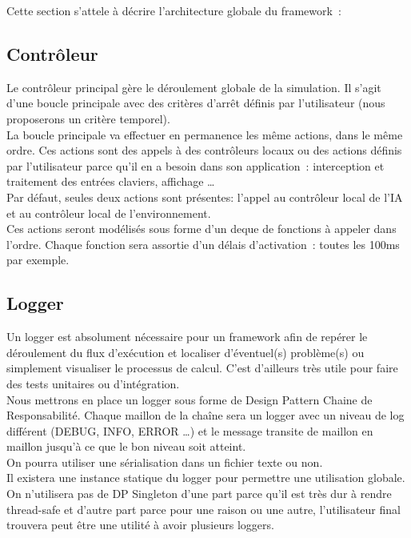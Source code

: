 Cette section s'attele à décrire l'architecture globale du framework~:

\subsection*{Contrôleur}

Le contrôleur principal gère le déroulement globale de la simulation. Il s'agit d'une boucle principale avec des critères d'arrêt définis par l'utilisateur (nous proposerons un critère temporel).\\
\indent La boucle principale va effectuer en permanence les même actions, dans le même ordre. Ces actions sont des appels à des contrôleurs locaux ou des actions définis par l'utilisateur parce qu'il en a besoin dans son application~: interception et traitement des entrées claviers, affichage \ldots \\
\indent Par défaut, seules deux actions sont présentes: l'appel au contrôleur local de l'IA et au contrôleur local de l'environnement.\\

Ces actions seront modélisés sous forme d'un deque de fonctions à appeler dans l'ordre. Chaque fonction sera assortie d'un délais d'activation~: toutes les 100ms par exemple.

\subsection*{Logger}
Un logger est absolument nécessaire pour un framework afin de repérer le déroulement du flux d'exécution et localiser d'éventuel(s) problème(s) ou simplement visualiser le processus de calcul. C'est d'ailleurs très utile pour faire des tests unitaires ou d'intégration.\\
\indent Nous mettrons en place un logger sous forme de Design Pattern Chaine de Responsabilité. Chaque maillon de la chaîne sera un logger avec un niveau de log différent (DEBUG, INFO, ERROR \ldots ) et le message transite de maillon en maillon jusqu'à ce que le bon niveau soit atteint.\\
\indent On pourra utiliser une sérialisation dans un fichier texte ou non.\\

Il existera une instance statique du logger pour permettre une utilisation globale. On n'utilisera pas de DP Singleton d'une part parce qu'il est très dur à rendre thread-safe et d'autre part parce pour une raison ou une autre, l'utilisateur final trouvera peut être une utilité à avoir plusieurs loggers.

